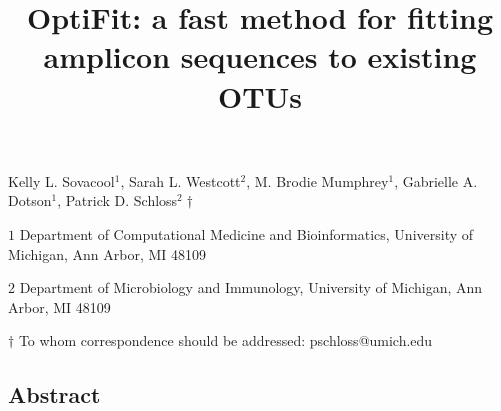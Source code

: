 \documentclass[
  12pt,
]{article}
\title{\textbf{OptiFit: a fast method for fitting amplicon sequences to
existing OTUs}}
\author{}
\date{\vspace{-2.5em}}
\begin{document}
\maketitle

\begin{center}
\vspace{25mm}

Kelly L. Sovacool${^1}$, Sarah L. Westcott${^2}$, M. Brodie Mumphrey${^1}$,
Gabrielle A. Dotson${^1}$, Patrick D. Schloss${^2\dagger}$

$1$ Department of Computational Medicine and Bioinformatics,
University of Michigan, Ann Arbor, MI 48109

$2$ Department of Microbiology and Immunology,
University of Michigan, Ann Arbor, MI 48109

\vspace{30mm}

$\dagger$ To whom correspondence should be addressed: pschloss@umich.edu

\end{center}

\newpage
\linenumbers

\hypertarget{abstract}{%
\subsection{Abstract}\label{abstract}}
\end{document}

